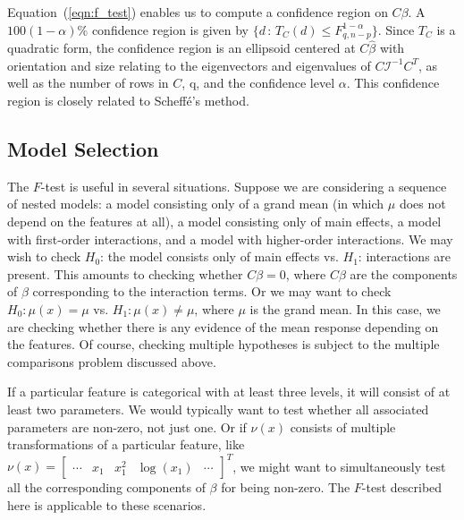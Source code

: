 \documentclass[12pt]{article}
\begin{document}
Equation~(\ref{eqn:f_test}) enables us to compute a confidence region on $C \beta$. A $100(1-\alpha)\%$ confidence region is given by $\{ d \, : \, T_C(d) \leq F_{q, n-p}^{1 - \alpha} \}$. Since $T_C$ is a quadratic form, the confidence region is an ellipsoid centered at $C \hat{\beta}$ with orientation and size relating to the eigenvectors and eigenvalues of $C\mathcal{I}^{-1} C^T$, as well as the number of rows in $C$, q, and the confidence level $\alpha$. This confidence region is closely related to Scheff\'e's method.

\subsection{Model Selection}
The $F$-test is useful in several situations. Suppose we are considering a sequence of nested models: a model consisting only of a grand mean (in which $\mu$ does not depend on the features at all), a model consisting only of main effects, a model with first-order interactions, and a model with higher-order interactions. We may wish to check $H_0$: the model consists only of main effects vs. $H_1$: interactions are present. This amounts to checking whether $C \beta = 0$, where $C \beta$ are the components of $\beta$ corresponding to the interaction terms. Or we may want to check $H_0: \mu(x) = \mu$ vs. $H_1: \mu(x) \neq \mu$, where $\mu$ is the grand mean. In this case, we are checking whether there is any evidence of the mean response depending on the features. Of course, checking multiple hypotheses is subject to the multiple comparisons problem discussed above.

If a particular feature is categorical with at least three levels, it will consist of at least two parameters. We would typically want to test whether all associated parameters are non-zero, not just one. Or if $\nu(x)$ consists of multiple transformations of a particular feature, like $\nu(x) = \begin{bmatrix} \cdots & x_1 & x_1^2 & \log(x_1) & \cdots \end{bmatrix}^T$, we might want to simultaneously test all the corresponding components of $\beta$ for being non-zero. The $F$-test described here is applicable to these scenarios.
\end{document}
